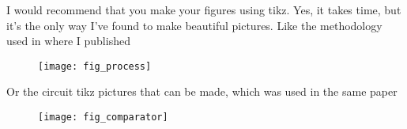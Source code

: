 I would recommend that you make your figures using tikz. Yes, it takes time, but it's the only
way I've found to make beautiful pictures. Like the methodology used in \cite{Wulff17} where I published \cite{ciccreator16}

\begin{figure}[tb]
\centerline{\texttt{[image: fig\_process]}}
\caption{}
\label{fig_cic}
\end{figure}

Or the circuit tikz pictures that can be made, which was used in the same paper
\begin{figure}[tb]
\centerline{\texttt{[image: fig\_comparator]}}
\caption{}
\label{fig_comp}
\end{figure}
